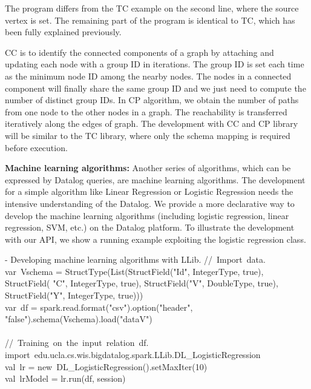 \eldl
The program differs from the TC example on the second line, where the source vertex is set. The remaining part of the program is identical to TC, which has been fully explained previously. 

CC is to identify the connected components of a graph by attaching and updating each node with a group ID in iterations. The group ID is set each time as the minimum node ID among the nearby nodes. The nodes in a connected component will finally share the same group ID and we just need to compute the number of distinct group IDs. In CP algorithm, we obtain the number of paths from one node to  the other nodes in a graph. The reachability  is transferred iteratively along the edges of graph. The development with CC and CP library will be similar to the TC library, where only the schema mapping is required before execution. 

\textbf{Machine learning algorithms:}
Another series of algorithms, which can be expressed by Datalog queries, are  machine learning algorithms.  The development for a simple algorithm like Linear Regression or Logistic Regression needs the intensive understanding of the Datalog. We provide a more declarative way to develop the machine learning algorithms (including logistic regression, linear regression, SVM, etc.)  on the Datalog platform. 
To illustrate the development with our API, we show a running example exploiting the logistic regression class.

\vspace{0.5em}
 - Developing machine learning algorithms with LLib.
\bldl
//\ Import\ data. 
\\
var\ Vschema = StructType(List(StructField("Id", IntegerType, true), \\StructField(
"C", IntegerType, true),
StructField("V", DoubleType, true),\\ StructField("Y", IntegerType, true))) \\

var\ df = spark.read.format("csv").option("header", "false").schema(Vschema).load("dataV") \\
\\
//\ Training\ on\ the\ input\ relation\ df. \\
import\ edu.ucla.cs.wis.bigdatalog.spark.LLib.DL\_LogisticRegression \\
val\ lr = new\  DL\_LogisticRegression().setMaxIter(10) \\
val\ lrModel = lr.run(df, session)


